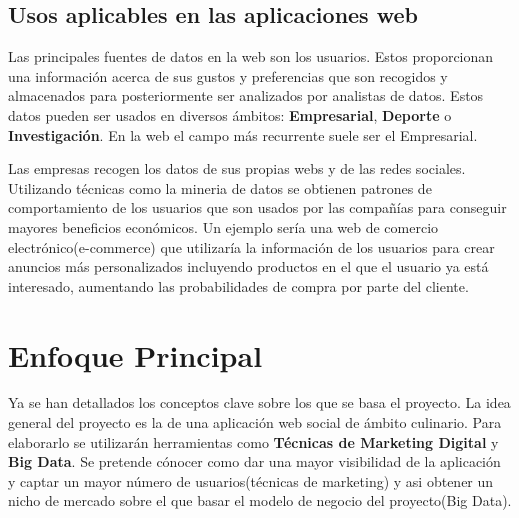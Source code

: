 \subsection{Usos aplicables en las aplicaciones web}

Las principales fuentes de datos en la web son los usuarios. Estos proporcionan una información acerca de sus gustos y preferencias que son recogidos y almacenados para posteriormente ser analizados por analistas de datos. Estos datos pueden ser usados en diversos ámbitos: \textbf{Empresarial}, \textbf{Deporte} o \textbf{Investigación}. En la web el campo más recurrente suele ser el Empresarial.

\vspace{5 mm}

Las empresas recogen los datos de sus propias webs y de las redes sociales. Utilizando técnicas como la mineria de datos se obtienen patrones de comportamiento de los usuarios que son usados por las compañías para conseguir mayores beneficios económicos. Un ejemplo sería una web de comercio electrónico(e-commerce) que utilizaría la información de los usuarios para crear anuncios más personalizados incluyendo productos en el que el usuario ya está interesado, aumentando las probabilidades de compra por parte del cliente.


\section{Enfoque Principal}

Ya se han detallados los conceptos clave sobre los que se basa el proyecto. La idea general del proyecto es la de una aplicación web social de ámbito culinario. Para elaborarlo se utilizarán herramientas como \textbf{Técnicas de Marketing Digital} y \textbf{Big Data}. Se pretende cónocer como dar una mayor visibilidad de la aplicación y captar un mayor número de usuarios(técnicas de marketing) y asi obtener un nicho de mercado sobre el que basar el modelo de negocio del proyecto(Big Data).

